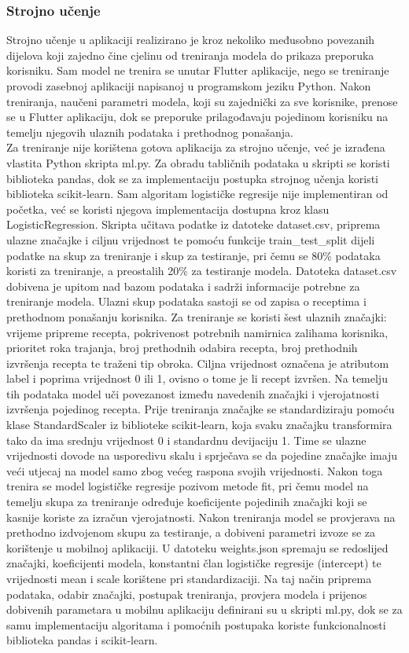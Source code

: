 \documentclass[diplomskirad]{fer}
\begin{document}
\subsubsection{Strojno učenje}
Strojno učenje u aplikaciji realizirano je kroz nekoliko međusobno povezanih dijelova koji zajedno čine cjelinu od treniranja modela do prikaza preporuka korisniku. Sam model ne trenira se unutar Flutter aplikacije, nego se treniranje provodi zasebnoj aplikaciji napisanoj u programskom jeziku Python. Nakon treniranja, naučeni parametri modela, koji su zajednički za sve korisnike, prenose se u Flutter aplikaciju, dok se preporuke prilagođavaju pojedinom korisniku na temelju njegovih ulaznih podataka i prethodnog ponašanja.
\\
Za treniranje nije korištena gotova aplikacija za strojno učenje, već je izrađena vlastita Python skripta ml.py. Za obradu tabličnih podataka u skripti se koristi biblioteka pandas, dok se za implementaciju postupka strojnog učenja koristi biblioteka scikit-learn. Sam algoritam logističke regresije nije implementiran od početka, već se koristi njegova implementacija dostupna kroz klasu LogisticRegression. Skripta učitava podatke iz datoteke dataset.csv, priprema ulazne značajke i ciljnu vrijednost te pomoću funkcije train\_test\_split dijeli podatke na skup za treniranje i skup za testiranje, pri čemu se 80\% podataka koristi za treniranje, a preostalih 20\% za testiranje modela. Datoteka dataset.csv dobivena je upitom nad bazom podataka i sadrži informacije potrebne za treniranje modela. Ulazni skup podataka sastoji se od zapisa o receptima i prethodnom ponašanju korisnika. Za treniranje se koristi šest ulaznih značajki: vrijeme pripreme recepta, pokrivenost potrebnih namirnica zalihama korisnika, prioritet roka trajanja, broj prethodnih odabira recepta, broj prethodnih izvršenja recepta te traženi tip obroka. Ciljna vrijednost označena je atributom label i poprima vrijednost 0 ili 1, ovisno o tome je li recept izvršen. Na temelju tih podataka model uči povezanost između navedenih značajki i vjerojatnosti izvršenja pojedinog recepta. Prije treniranja značajke se standardiziraju pomoću klase StandardScaler iz biblioteke scikit-learn, koja svaku značajku transformira tako da ima srednju vrijednost 0 i standardnu devijaciju 1. Time se ulazne vrijednosti dovode na usporedivu skalu i sprječava se da pojedine značajke imaju veći utjecaj na model samo zbog većeg raspona svojih vrijednosti. Nakon toga trenira se model logističke regresije pozivom metode fit, pri čemu model na temelju skupa za treniranje određuje koeficijente pojedinih značajki koji se kasnije koriste za izračun vjerojatnosti. Nakon treniranja model se provjerava na prethodno izdvojenom skupu za testiranje, a dobiveni parametri izvoze se za korištenje u mobilnoj aplikaciji. U datoteku weights.json spremaju se redoslijed značajki, koeficijenti modela, konstantni član logističke regresije (intercept) te vrijednosti mean i scale korištene pri standardizaciji. Na taj način priprema podataka, odabir značajki, postupak treniranja, provjera modela i prijenos dobivenih parametara u mobilnu aplikaciju definirani su u skripti ml.py, dok se za samu implementaciju algoritama i pomoćnih postupaka koriste funkcionalnosti biblioteka pandas i scikit-learn.
\end{document}
